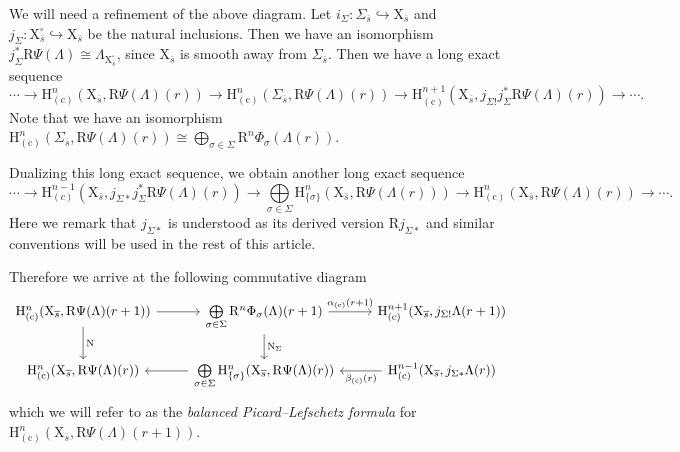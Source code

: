 \documentclass[10pt]{amsart}
\numberwithin{equation}{section}
\theoremstyle{definition}
\def\rmc{\mathrm{c}}
\def\rmH{\mathrm{H}}
\def\rmR{\mathrm{R}}
\def\rmX{\mathrm{X}}
\begin{document}
We will need a refinement of the above diagram. Let $i_{\Sigma}: \Sigma_{\overline{s}}\hookrightarrow \rmX_{\overline{s}}$ and $j_{\Sigma}: \rmX^{\square}_{\overline{s}}\hookrightarrow \rmX_{\overline{s}}$ be the natural inclusions. Then we have an isomorphism $j^{\ast}_{\Sigma}\rmR\Psi(\Lambda)\cong \Lambda_{\rmX^{\square}_{\overline{s}}}$, since $\rmX_{\overline{s}}$ is smooth away from $\Sigma_{\overline{s}}$. Then we have a long exact sequence
\begin{equation*}
\cdots\rightarrow\rmH^{n}_{(\rmc)}(\rmX_{\overline{s}}, \rmR\Psi(\Lambda)(r))\rightarrow \rmH^{n}_{(\rmc)}(\Sigma_{\overline{s}}, \rmR\Psi(\Lambda)(r))\rightarrow \rmH^{n+1}_{(\rmc)}(\rmX_{\overline{s}}, j_{\Sigma!}j^{\ast}_{\Sigma}\rmR\Psi(\Lambda)(r))\rightarrow\cdots.
\end{equation*}
Note that we have an isomorphism $\rmH^{n}_{(\rmc)}(\Sigma_{\overline{s}}, \rmR\Psi(\Lambda)(r))\cong\bigoplus\limits_{\sigma\in\Sigma}\rmR^{n}\Phi_{\sigma}(\Lambda(r))$. 

Dualizing this long exact sequence, we obtain another long exact sequence
\begin{equation*}
\cdots\rightarrow\rmH^{n-1}_{(c)}(\rmX_{\overline{s}}, j_{\Sigma\ast}j^{\ast}_{\Sigma}\rmR\Psi(\Lambda)(r))\rightarrow\bigoplus\limits_{\sigma\in\Sigma}\rmH^{n}_{\{\sigma\}}(\rmX_{\overline{s}}, \rmR\Psi(\Lambda(r)))\rightarrow\rmH^{n}_{(\rmc)}(\rmX_{\overline{s}}, \rmR\Psi(\Lambda)(r))\rightarrow \cdots.
\end{equation*}
Here we remark that $ j_{\Sigma\ast}$ is understood as its derived version $\rmR j_{\Sigma\ast}$ and similar conventions will be used in the rest of this article.

Therefore we arrive at the following commutative diagram
\begin{equation}\label{Pic-Lef-no-c}
\begin{tikzcd}
\mathrm{H}^{n}_{(\rmc)}(\rmX_{\overline{s}}, \rmR\Psi(\Lambda)(r+1)) \arrow[r] \arrow[d, "\mathrm{N}"] & \bigoplus\limits_{\sigma\in\Sigma}\rmR^{n}\Phi_{\sigma}(\Lambda)(r+1) \arrow[d, "\mathrm{N}_{\Sigma}"]  \arrow[r, "\alpha_{(\rmc)}(r+1)"] & \mathrm{H}^{n+1}_{(\rmc)}(\rmX_{\overline{s}}, j_{\Sigma!}\Lambda(r+1))\\
\mathrm{H}^{n}_{(\rmc)}(\rmX_{\overline{s}}, \rmR\Psi(\Lambda)(r)) &\bigoplus\limits_{\sigma\in\Sigma}\rmH^{n}_{\{\sigma\}}(\rmX_{\overline{s}}, \rmR\Psi(\Lambda)(r))  \arrow[l] & \mathrm{H}^{n-1}_{(\rmc)}(\rmX_{\overline{s}}, j_{\Sigma\ast}\Lambda(r))\arrow[l, "\beta_{(\rmc)}(r)"]        
\end{tikzcd}          
\end{equation}
which we will refer to as the {\em balanced Picard--Lefschetz formula} for $\mathrm{H}^{n}_{(\rmc)}(\rmX_{\overline{s}}, \rmR\Psi(\Lambda)(r+1))$. 
\end{document}
